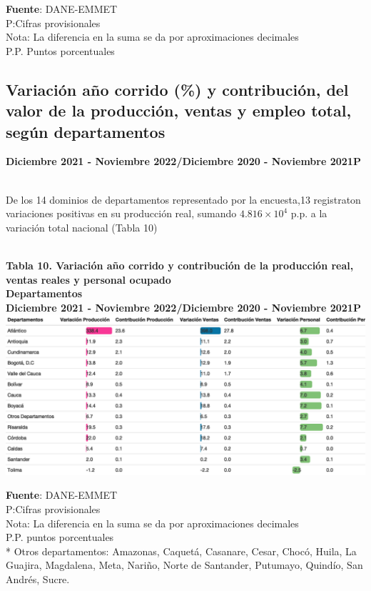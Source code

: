 \documentclass[
]{article}
\begin{document}
\textbf{Fuente}: DANE-EMMET\\
P:Cifras provisionales\\
Nota: La diferencia en la suma se da por aproximaciones decimales\\
P.P. Puntos porcentuales\\

\hypertarget{variaciuxf3n-auxf1o-corrido-y-contribuciuxf3n-del-valor-de-la-producciuxf3n-ventas-y-empleo-total-seguxfan-departamentos-1}{%
\subsection{Variación año corrido (\%) y contribución, del valor de la
producción, ventas y empleo total, según
departamentos}\label{variaciuxf3n-auxf1o-corrido-y-contribuciuxf3n-del-valor-de-la-producciuxf3n-ventas-y-empleo-total-seguxfan-departamentos-1}}

\textbf{Diciembre 2021 - Noviembre 2022/Diciembre 2020 - Noviembre
2021P}\\
\strut \\

De los 14 dominios de departamentos representado por la encuesta,13
registraton variaciones positivas en su producción real, sumando
\ensuremath{4.816\times 10^{4}} p.p. a la variación total nacional
(Tabla 10)\\
\strut \\
\textbf{Tabla 10. Variación año corrido y contribución de la producción
real, ventas reales y personal ocupado}\\
\textbf{Departamentos}\\
\textbf{Diciembre 2021 - Noviembre 2022/Diciembre 2020 - Noviembre
2021P}\\

\includegraphics{boletin_files/figure-latex/tabla10_view-1.png}

\textbf{Fuente}: DANE-EMMET\\
P:Cifras provisionales\\
Nota: La diferencia en la suma se da por aproximaciones decimales\\
P.P. puntos porcentuales\\
* Otros departamentos: Amazonas, Caquetá, Casanare, Cesar, Chocó, Huila,
La Guajira, Magdalena, Meta, Nariño, Norte de Santander, Putumayo,
Quindío, San Andrés, Sucre.\\
\end{document}
